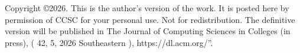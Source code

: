 Copyright \copyright 2026. This is the author's version of the work. It is posted here by permission of CCSC for your
personal use. Not for redistribution. The definitive version will be published in The Journal of Computing Sciences in
Colleges (in press), ( 42, 5, 2026 Southeastern ), https://dl.acm.org/”.
